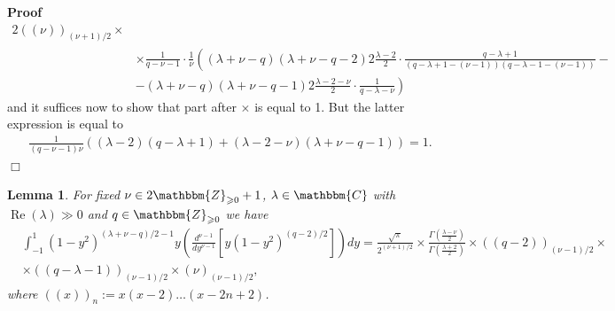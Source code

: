 \documentclass{article}
\newcommand{\assign}{:=}
\newcommand{\tmop}[1]{\ensuremath{\operatorname{#1}}}
\newenvironment{proof}{\noindent\textbf{Proof\ }}{\hspace*{\fill}$\Box$\medskip}
\numberwithin{definition}{section}
\newtheorem{lemma}{Lemma}
\numberwithin{lemma}{section}
\numberwithin{proposition}{section}
{\theorembodyfont{\rmfamily}\newtheorem{remark}{Remark}
\numberwithin{remark}{section}
}
\begin{document}
\begin{proof}
\begin{eqnarray*}
{    2} ( ( \nu))_{( \nu + 1) / 2} \times & \\
    & \times \frac{1}{q - \nu - 1} \cdot \frac{1}{\nu} \left( ( \lambda + \nu
    - q) ( \lambda + \nu - q - 2) 2 \frac{\lambda - 2}{2} \cdot \frac{q -
    \lambda + 1}{( q - \lambda + 1 - ( \nu - 1)) ( q - \lambda - 1 - ( \nu -
    1))} - \right. & \\
    & - \left. ( \lambda + \nu - q) ( \lambda + \nu - q - 1) 2 \frac{\lambda
    - 2 - \nu}{2} \cdot \frac{1}{q - \lambda - \nu} \right) & 
  \end{eqnarray*}
  and it suffices now to show that part after $\times$ is equal to 1. But the
  latter expression is equal to
  \begin{eqnarray*}
    & \frac{1}{( q - \nu - 1) \nu} ( ( \lambda - 2) ( q - \lambda + 1) + (
    \lambda - 2 - \nu) ( \lambda + \nu - q - 1)) = 1. & 
  \end{eqnarray*}
\end{proof}

\begin{lemma}
  \label{KC-normalization-2:lem-kfin-11}For fixed $\nu \in
  2\mathbbm{Z}_{\geqslant 0} + 1$, $\lambda \in \mathbbm{C}$ with $\tmop{Re} (
  \lambda) \gg 0$ and $q \in \mathbbm{Z}_{\geqslant 0}$ we have
  \begin{eqnarray*}
    & \int_{- 1}^1 ( 1 - y^2)^{( \lambda + \nu - q) / 2 - 1} y \left(
    \frac{d^{\nu - 1}}{d y^{\nu - 1}} [ y ( 1 - y^2)^{( q - 2) / 2}] \right) d
    y = \frac{\sqrt{\pi}}{2^{( \nu + 1) / 2}} \times \frac{\Gamma \left(
    \frac{\lambda - \nu}{2} \right)}{\Gamma \left( \frac{\lambda + 2}{2}
    \right)} \times ( ( q - 2))_{( \nu - 1) / 2} \times & \\
    & \times ( ( q - \lambda - 1))_{( \nu - 1) / 2} \times ( \nu)_{( \nu - 1)
    / 2}, & 
  \end{eqnarray*}
  where $( ( x))_n \assign x ( x - 2) \ldots ( x - 2 n + 2)$.
\end{lemma}
\end{document}
